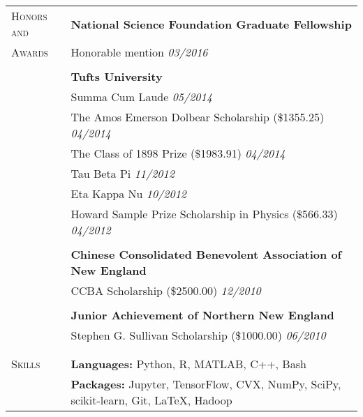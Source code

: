\documentclass[letterpaper,11pt,oneside]{article}
\begin{document}
\begin{longtable}{@{} p{2.5cm} p{14.8cm}}
 \large{\textsc{Honors and}}  & \textbf{National Science Foundation Graduate Fellowship}   \\
 \large{\textsc{Awards}} & Honorable mention \hfill \textit{03/2016} \\
& \\
& \textbf{Tufts University} \\
& Summa Cum Laude \hfill \textit{05/2014} \\
& The Amos Emerson Dolbear Scholarship (\$1355.25) \hfill \textit{04/2014} \\
& The Class of 1898 Prize (\$1983.91) \hfill \textit{04/2014} \\
& Tau Beta Pi \hfill \textit{11/2012} \\
& Eta Kappa Nu \hfill \textit{10/2012} \\
& Howard Sample Prize Scholarship in Physics (\$566.33) \hfill \textit{04/2012} \\
& \\
& \textbf{Chinese Consolidated Benevolent Association of New England} \\
& CCBA Scholarship (\$2500.00) \hfill \textit{12/2010} \\
& \\
& \textbf{Junior Achievement of Northern New England} \\
& Stephen G. Sullivan Scholarship (\$1000.00) \hfill \textit{06/2010} \\
& \\
& \\
     
  \large{\textsc{Skills}}   & \textbf{Languages:} Python, R, MATLAB, C++, Bash \\
   & \textbf{Packages:} Jupyter, TensorFlow, CVX, NumPy, SciPy, scikit-learn, Git, \LaTeX, Hadoop \\
\end{longtable}
\end{document}
